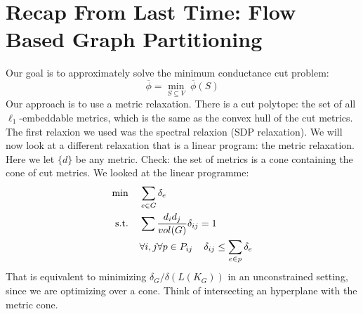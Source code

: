 \documentclass[11pt]{article}
\begin{document}
\section*{Recap From Last Time: Flow Based Graph Partitioning}
Our goal is to approximately solve the minimum conductance cut problem:
\[
    \overline{\phi} = \underset{S \subseteq V}{\min}\; \overline{\phi}(
    S)
\]
Our approach is to use a metric relaxation. There is a cut polytope: the set of all $\ell_1$-embeddable metrics, which is the same as the convex hull of the cut metrics. The first relaxion we used was the spectral relaxion (SDP relaxation). We will now look at a different relaxation that is a linear program: the metric relaxation. Here we let $\{d\}$ be any metric. Check: the set of metrics is a cone containing the cone of cut metrics.
We looked at the linear programme:
\begin{align*}
    \min \hspace{2mm}& \hspace{2mm}\sum_{e \in G} \delta_e\\
    \text{s.t.}\hspace{2mm}&\hspace{2mm}\sum \frac{d_id_j}{vol(G)}\delta_{ij} = 1\\
    &\hspace{2mm}\forall i,j \forall p \in P_{ij}\hspace{4mm}\delta_{ij}\leq \sum_{e\in p}\delta_e
\end{align*}
That is equivalent to minimizing $\delta_{G}/ \delta(L(K_G))$ in an unconstrained setting, since we are optimizing over a cone. Think of intersecting an hyperplane with the metric cone.
\end{document}
